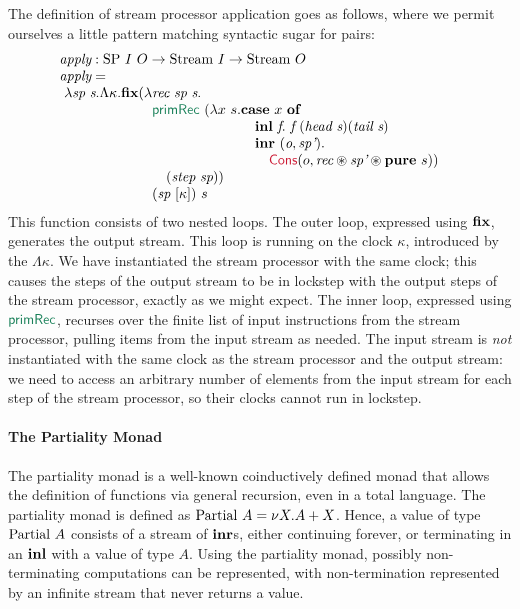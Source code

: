 The definition of stream processor application goes as follows, where
we permit ourselves a little pattern matching syntactic sugar for
pairs:
\begin{displaymath}
  \begin{array}{@{}l}
    \ident{apply} : \tyname{SP}~I~O \to \tyname{Stream}~I \to \tyname{Stream}~O \\
    \ident{apply} = \\
    \ \begin{array}[t]{@{}l@{}l}
      \lambda \ident{sp}~\ident{s}.\Lambda \kappa. \kw{fix}(\lambda&\ident{rec}~\ident{sp}~\ident{s}. \\
      & \elim{primRec}~(\lambda x~s.
      \begin{array}[t]{@{}l}
        \kw{case}~x~\kw{of} \\
        \quad \kw{inl}~\ident{f}.~\ident{f}~(\ident{head}~\ident{s}) (\ident{tail}~\ident{s}) \\
        \quad \kw{inr}~(\ident{o},\ident{sp'}).\\
        \quad \quad \cons{Cons}(o,\ident{rec} \circledast \ident{sp'} \circledast \kw{pure}~s))
      \end{array} \\
      & \quad (\ident{step}~\ident{sp})) \\
      & (\ident{sp}~[\kappa])~s
    \end{array}
  \end{array}
\end{displaymath}
This function consists of two nested loops. The outer loop, expressed
using $\textbf{fix}$, generates the output stream. This loop is running on
the clock $\kappa$, introduced by the $\Lambda \kappa$. We have
instantiated the stream processor with the same clock; this causes the
steps of the output stream to be in lockstep with the output steps of
the stream processor, exactly as we might expect. The inner loop,
expressed using $\elim{primRec}$, recurses over the finite list of
input instructions from the stream processor, pulling items from the
input stream as needed. The input stream is \emph{not} instantiated
with the same clock as the stream processor and the output stream: we
need to access an arbitrary number of elements from the input stream
for each step of the stream processor, so their clocks cannot run in
lockstep.

\paragraph{The Partiality Monad} The partiality monad
\cite{danielsson,XXX} is a well-known coinductively defined monad that
allows the definition of functions via general recursion, even in a
total language. The partiality monad is defined as $\textrm{Partial}~A
= \nu X. A + X$. Hence, a value of type $\textrm{Partial}~A$ consists
of a stream of $\textbf{inr}$s, either continuing forever, or terminating
in an $\textbf{inl}$ with a value of type $A$. Using the partiality monad,
possibly non-terminating computations can be represented, with
non-termination represented by an infinite stream that never returns a
value.


